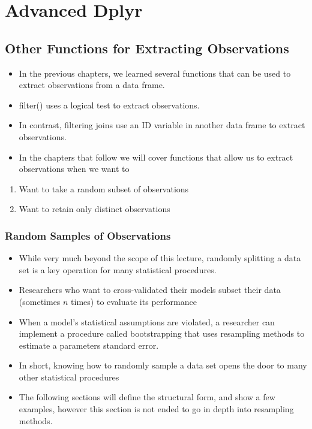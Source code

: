 \documentclass[]{book}
\providecommand{\tightlist}{%
  \setlength{\itemsep}{0pt}\setlength{\parskip}{0pt}}
\theoremstyle{definition}
\theoremstyle{definition}
\theoremstyle{definition}
\theoremstyle{remark}
\begin{document}
\hypertarget{part-advanced-dplyr}{%
\part{Advanced Dplyr}\label{part-advanced-dplyr}}

\hypertarget{other-functions-for-extracting-observations}{%
\chapter{Other Functions for Extracting Observations}\label{other-functions-for-extracting-observations}}

\begin{itemize}
\tightlist
\item
  In the previous chapters, we learned several functions that can be used to extract observations from a data frame.
\item
  filter() uses a logical test to extract observations.
\item
  In contrast, filtering joins use an ID variable in another data frame to extract observations.
\item
  In the chapters that follow we will cover functions that allow us to extract observations when we want to
\end{itemize}

\begin{enumerate}
\def\labelenumi{\arabic{enumi}.}
\tightlist
\item
  Want to take a random subset of observations
\item
  Want to retain only distinct observations
\end{enumerate}

\hypertarget{random-samples-of-observations}{%
\section{Random Samples of Observations}\label{random-samples-of-observations}}

\begin{itemize}
\tightlist
\item
  While very much beyond the scope of this lecture, randomly splitting a data set is a key operation for many statistical procedures.
\item
  Researchers who want to cross-validated their models subset their data (sometimes \(n\) times) to evaluate its performance
\item
  When a model's statistical assumptions are violated, a researcher can implement a procedure called bootstrapping that uses resampling methods to estimate a parameters standard error.
\item
  In short, knowing how to randomly sample a data set opens the door to many other statistical procedures
\item
  The following sections will define the structural form, and show a few examples, however this section is not ended to go in depth into resampling methods.
\end{itemize}
\end{document}

